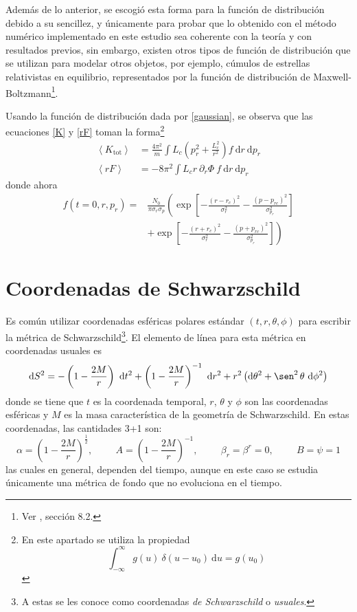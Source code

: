 \documentclass[11pt,twoside,openright,spanish]{report}
\numberwithin{equation}{chapter}
\numberwithin{figure}{chapter}
\numberwithin{table}{chapter}
\renewcommand{\sin}{\operatorname{\sen}}
\begin{document}
Además de lo anterior, se escogió esta forma para la función de distribución debido a su sencillez, y únicamente para probar que lo obtenido con el método numérico implementado en este estudio sea coherente con la teoría y con resultados previos, sin embargo, existen otros tipos de función de distribución que se utilizan para modelar otros objetos, por ejemplo, cúmulos de estrellas relativistas en equilibrio, representados por la función de distribución de Maxwell-Boltzmann\footnote{Ver \citet{Shapiro2010}, sección 8.2.}. 

Usando la función de distribución dada por \eqref{gaussian}, se observa que las ecuaciones \eqref{K} y \eqref{rF} toman la forma\footnote{En este apartado se utiliza la propiedad
	\begin{equation*}
	\int_{-\infty}^{\infty} g(u)\ \delta(u-u_0)\ \text{d}u=g(u_0)
	\end{equation*}} 
\begin{align}
\left<K_{\text{tot}}\right>&=\frac{4\pi^2}{m}\int L_c\left(p_r^2+\frac{L_c^2}{r^2}\right)f\ \text{d}r\ \text{d}p_r\\
\left<rF\right>&=-8\pi^2\int L_cr\ \partial_r\Phi\ f\ \text{d}r\ \text{d}p_r\
\end{align}
donde ahora
\begin{align}
\nonumber
f(t=0,r,p_r)=&\frac{N_0}{\pi\sigma_r\sigma_p}\left(\exp\left[-\frac{\left(r-r_c\right)^2}{\sigma_r^2}-\frac{\left(p-p_{rc}\right)^2}{\sigma_{p_r}^2}\right]\right.\\
&\left.+\exp\left[-\frac{\left(r+r_c\right)^2}{\sigma_r^2}-\frac{\left(p+p_{rc}\right)^2}{\sigma_{p_r}^2}\right]\right)
\end{align}

\section{Coordenadas de Schwarzschild}
\noindent
Es común utilizar coordenadas esféricas polares estándar $(t,r,\theta,\phi)$ para escribir la métrica de Schwarzschild\footnote{A estas se les conoce como coordenadas \textit{de Schwarzschild} o \textit{usuales}.}. El elemento de línea para esta métrica en coordenadas usuales es 
\begin{equation}
\text{d}S^2=-\left(1-\frac{2M}{r}\right)\ \text{d}t^2 +\left(1-\frac{2M}{r}\right)^{-1}\ \text{d}r^2 +r^2\left(\text{d}\theta^2+\sin^2\theta\ \text{d}\phi^2\right)
\end{equation}
donde se tiene que $t$ es la coordenada temporal, $r$, $\theta$ y $\phi$ son las coordenadas esféricas y $M$ es la masa característica de la geometría de Schwarzschild. En estas coordenadas, las cantidades 3+1 son:
\begin{equation}
\alpha=\left(1-\frac{2M}{r}\right)^{\frac{1}{2}}, \hspace{1cm}A=\left(1-\frac{2M}{r}\right)^{-1}, \hspace{1cm}\beta_r=\beta^r=0, \hspace{1cm}B=\psi=1
\end{equation}
las cuales en general, dependen del tiempo, aunque en este caso se estudia únicamente una métrica de fondo que no evoluciona en el tiempo.
\end{document}
